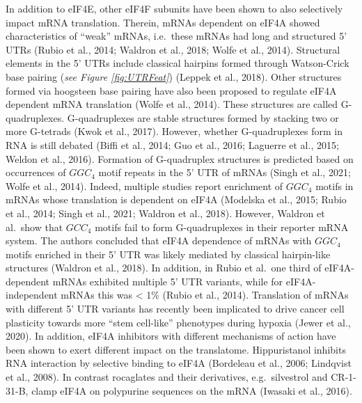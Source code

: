 \documentclass[
  12pt,
  openany]{book}
\begin{document}
In addition to eIF4E, other eIF4F subunits have been shown to also selectively impact mRNA translation. Therein, mRNAs dependent on eIF4A showed characteristics of ``weak'' mRNAs, i.e.~these mRNAs had long and structured 5' UTRs (Rubio et al., 2014; Waldron et al., 2018; Wolfe et al., 2014). Structural elements in the 5' UTRs include classical hairpins formed through Watson-Crick base pairing (\emph{see Figure \ref{fig:UTRFeat}}) (Leppek et al., 2018). Other structures formed via hoogsteen base pairing have also been proposed to regulate eIF4A dependent mRNA translation (Wolfe et al., 2014). These structures are called G-quadruplexes. G-quadruplexes are stable structures formed by stacking two or more G-tetrads (Kwok et al., 2017). However, whether G-quadruplexes form in RNA is still debated (Biffi et al., 2014; Guo et al., 2016; Laguerre et al., 2015; Weldon et al., 2016). Formation of G-quadruplex structures is predicted based on occurrences of \(GGC_4\) motif repeats in the 5' UTR of mRNAs (Singh et al., 2021; Wolfe et al., 2014). Indeed, multiple studies report enrichment of \(GGC_4\) motifs in mRNAs whose translation is dependent on eIF4A (Modelska et al., 2015; Rubio et al., 2014; Singh et al., 2021; Waldron et al., 2018). However, Waldron et al.~show that \(GCC_4\) motifs fail to form G-quadruplexes in their reporter mRNA system. The authors concluded that eIF4A dependence of mRNAs with \(GGC_4\) motifs enriched in their 5' UTR was likely mediated by classical hairpin-like structures (Waldron et al., 2018). In addition, in Rubio et al.~one third of eIF4A-dependent mRNAs exhibited multiple 5' UTR variants, while for eIF4A-independent mRNAs this was \textless{} 1\% (Rubio et al., 2014). Translation of mRNAs with different 5' UTR variants has recently been implicated to drive cancer cell plasticity towards more ``stem cell-like'' phenotypes during hypoxia (Jewer et al., 2020). In addition, eIF4A inhibitors with different mechanisms of action have been shown to exert different impact on the translatome. Hippuristanol inhibits RNA interaction by selective binding to eIF4A (Bordeleau et al., 2006; Lindqvist et al., 2008). In contrast rocaglates and their derivatives, e.g.~silvestrol and CR-1-31-B, clamp eIF4A on polypurine sequences on the mRNA (Iwasaki et al., 2016).
\end{document}
